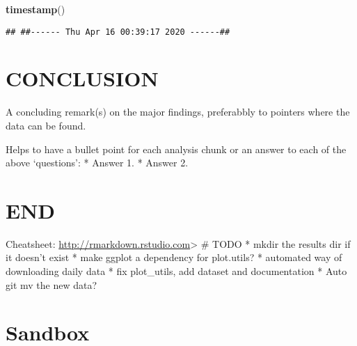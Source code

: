 \documentclass[]{article}
\newenvironment{Shaded}{\begin{snugshade}}{\end{snugshade}}
\newcommand{\KeywordTok}[1]{\textcolor[rgb]{0.13,0.29,0.53}{\textbf{{#1}}}}
\newcommand{\NormalTok}[1]{{#1}}
\begin{document}
\begin{Shaded}
\begin{Highlighting}[]
\KeywordTok{timestamp}\NormalTok{()}
\end{Highlighting}
\end{Shaded}

\begin{verbatim}
## ##------ Thu Apr 16 00:39:17 2020 ------##
\end{verbatim}

\section{CONCLUSION}\label{conclusion}

A concluding remark(s) on the major findings, preferabbly to pointers
where the data can be found.

Helps to have a bullet point for each analysis chunk or an answer to
each of the above `questions': * Answer 1. * Answer 2.

\section{END}\label{end}

Cheatsheet: \url{http://rmarkdown.rstudio.com}\textgreater{} \# TODO *
mkdir the results dir if it doesn't exist * make ggplot a dependency for
plot.utils? * automated way of downloading daily data * fix plot\_utils,
add dataset and documentation * Auto git mv the new data?

\section{Sandbox}\label{sandbox}
\end{document}
